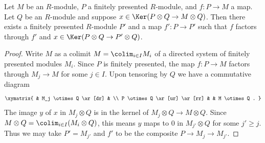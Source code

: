 \begin{lemma}
\label{lemma-kernel-tensored-fp}
Let $M$ be an $R$-module, $P$ a finitely presented $R$-module, and $f: P
\to M$ a map.  Let $Q$ be an $R$-module and suppose $x \in \Ker(P
\otimes Q \to M \otimes Q)$.  Then there exists a finitely presented
$R$-module $P'$ and a map $f': P \to P'$ such that $f$ factors through
$f'$ and $x \in \Ker(P \otimes Q \to P' \otimes Q)$.
\end{lemma}

\begin{proof}
Write $M$ as a colimit $M = \colim_{i \in I} M_i$ of a directed system of
finitely presented modules $M_i$.  Since $P$ is finitely presented, the map $f:
P \to M$ factors through $M_j \to M$ for some $j \in I$.  Upon
tensoring by $Q$ we have a commutative diagram
$$
\xymatrix{
& M_j \otimes Q \ar[dr] & \\
P \otimes Q \ar[ur] \ar[rr] & & M \otimes Q .
}
$$
The image $y$ of $x$ in $M_j \otimes Q$ is in the kernel of $M_j \otimes Q
\to M \otimes Q$.  Since $M \otimes Q = \colim_{i \in I} (M_i
\otimes
Q)$, this means $y$ maps to $0$ in $M_{j'} \otimes Q$ for some $j' \geq j$.
Thus we may take $P' = M_{j'}$ and $f'$ to be the composite $P \to M_j
\to M_{j'}$.
\end{proof}
